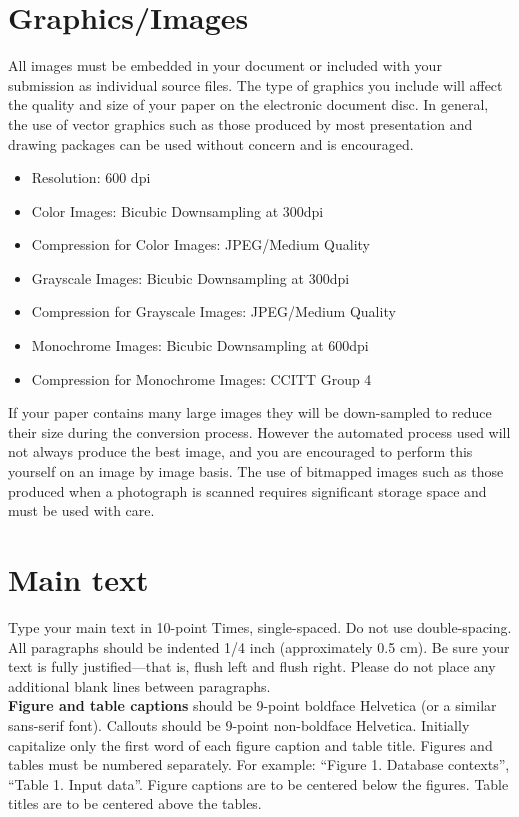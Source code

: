 \documentclass[10pt]{article}
\begin{document}
\section{Graphics/Images}

All images must be embedded in your document or included with your submission as individual source files. The type of graphics you include will affect the quality and size of your paper on the electronic document disc. In general, the use of vector graphics such as those produced by most presentation and drawing packages can be used without concern and is encouraged.

\begin{itemize}
\setlength\itemsep{0em}
\item Resolution: 600 dpi
\item Color Images: Bicubic Downsampling at 300dpi
\item Compression for Color Images: JPEG/Medium Quality
\item Grayscale Images: Bicubic Downsampling at 300dpi
\item Compression for Grayscale Images: JPEG/Medium Quality
\item Monochrome Images: Bicubic Downsampling at 600dpi
\item Compression for Monochrome Images: CCITT Group 4
\end{itemize}

If your paper contains many large images they will be down-sampled to reduce their size during the conversion process.  However the automated process used will not always produce the best image, and you are encouraged to perform this yourself on an image by image basis. The use of bitmapped images such as those produced when a photograph is scanned requires significant storage space and must be used with care.

\section{Main text}

Type your main text in 10-point Times, single-spaced. Do not use double-spacing. All paragraphs should be indented 1/4 inch (approximately 0.5 cm).  Be sure your text is fully justified—that is, flush left and flush right. Please do not place any additional blank lines between paragraphs. \\
\textbf{Figure and table captions} should be 9-point boldface Helvetica (or a similar sans-serif font).  Callouts should be 9-point non-boldface Helvetica. Initially capitalize only the first word of each figure caption and table title. Figures and tables must be numbered separately. For example: ``Figure 1. Database contexts'', ``Table 1. Input data''. Figure captions are to be centered below the figures. Table titles are to be centered above the tables.
\end{document}
